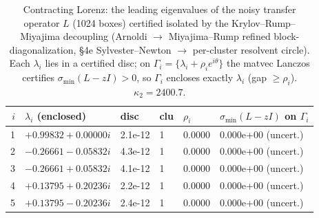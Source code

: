 \begin{table}[h]\centering\begin{tabular}{r l l l l l}\toprule
$i$ & $\lambda_i$ (enclosed) & disc & clu & $\rho_i$ & $\sigma_{\min}(L-zI)$ on $\Gamma_i$ \\\midrule
1 & $+0.99832+0.00000i$ & 2.1e-12 & 1 & 0.0000 & 0.000e+00 (uncert.) \\
2 & $-0.26661-0.05832i$ & 4.3e-12 & 1 & 0.0000 & 0.000e+00 (uncert.) \\
3 & $-0.26661+0.05832i$ & 4.1e-12 & 1 & 0.0000 & 0.000e+00 (uncert.) \\
4 & $+0.13795+0.20236i$ & 2.2e-12 & 1 & 0.0000 & 0.000e+00 (uncert.) \\
5 & $+0.13795-0.20236i$ & 2.4e-12 & 1 & 0.0000 & 0.000e+00 (uncert.) \\
\bottomrule\end{tabular}
\caption{Contracting Lorenz: the leading eigenvalues of the noisy transfer operator $L$ (1024 boxes) certified isolated by the Krylov--Rump--Miyajima decoupling (Arnoldi $\to$ Miyajima--Rump refined block-diagonalization, \S4e Sylvester--Newton $\to$ per-cluster resolvent circle). Each $\lambda_i$ lies in a certified disc; on $\Gamma_i=\{\lambda_i+\rho_i e^{i\theta}\}$ the matvec Lanczos certifies $\sigma_{\min}(L-zI)>0$, so $\Gamma_i$ encloses exactly $\lambda_i$ (gap $\ge\rho_i$). $\kappa_2=2400.7$.}
\end{table}
